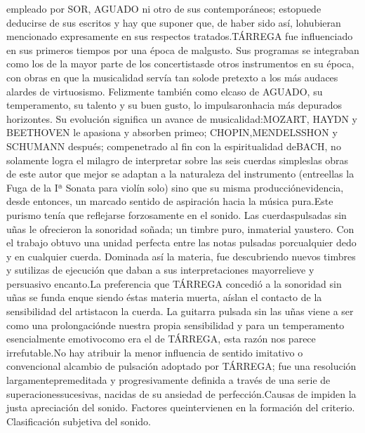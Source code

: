 \documentclass[
11pt, %
a4paper, %
oneside, %
headinclude,footinclude, %
BCOR5mm, %
]{scrartcl}
\begin{document}
{empleado por SOR, AGUADO ni otro de sus contemporáneos; estopuede deducirse de sus escritos y hay que suponer que, de haber sido así, lohubieran mencionado expresamente en sus respectos tratados.TÁRREGA fue influenciado en sus primeros tiempos por una época de malgusto. Sus programas se integraban como los de la mayor parte de los concertistasde otros instrumentos en su época, con obras en que la musicalidad servía tan solode pretexto a los más audaces alardes de virtuosismo. Felizmente también como elcaso de AGUADO, su temperamento, su talento y su buen gusto, lo impulsaronhacia más depurados horizontes. Su evolución significa un avance de musicalidad:MOZART, HAYDN y BEETHOVEN le apasiona y absorben primeo; CHOPIN,MENDELSSHON y SCHUMANN después; compenetrado al fin con la espiritualidad deBACH, no solamente logra el milagro de interpretar sobre las seis cuerdas simpleslas obras de este autor que mejor se adaptan a la naturaleza del instrumento (entreellas la Fuga de la Iª Sonata para violín solo) sino que su misma producciónevidencia, desde entonces, un marcado sentido de aspiración hacia la música pura.Este purismo tenía que reflejarse forzosamente en el sonido. Las cuerdaspulsadas sin uñas le ofrecieron la sonoridad soñada; un timbre puro, inmaterial yaustero. Con el trabajo obtuvo una unidad perfecta entre las notas pulsadas porcualquier dedo y en cualquier cuerda. Dominada así la materia, fue descubriendo nuevos timbres y sutilizas de ejecución que daban a sus interpretaciones mayorrelieve y persuasivo encanto.La preferencia que TÁRREGA concedió a la sonoridad sin uñas se funda enque siendo éstas materia muerta, aíslan el contacto de la sensibilidad del artistacon la cuerda. La guitarra pulsada sin las uñas viene a ser como una prolongaciónde nuestra propia sensibilidad y para un temperamento esencialmente emotivocomo era el de TÁRREGA, esta razón nos parece irrefutable.No hay atribuir la menor influencia de sentido imitativo o convencional alcambio de pulsación adoptado por TÁRREGA; fue una resolución largamentepremeditada y progresivamente definida a través de una serie de superacionessucesivas, nacidas de su ansiedad de perfección.Causas de impiden la justa apreciación del sonido. Factores queintervienen en la formación del criterio. Clasificación subjetiva del sonido.
}
\end{document}
